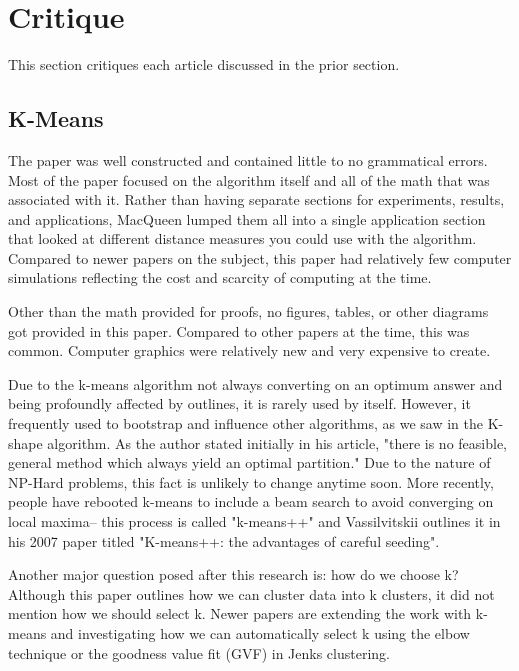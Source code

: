 \documentclass[12pt]{apa6}
\begin{document}
\section{Critique}

This section critiques each article discussed in the prior section.

\subsection{K-Means}


The paper was well constructed and contained little to no grammatical errors. Most of the paper focused on the algorithm itself and all of the math that was associated with it. Rather than having separate sections for experiments, results, and applications, MacQueen lumped them all into a single application section that looked at different distance measures you could use with the algorithm. Compared to newer papers on the subject, this paper had relatively few computer simulations reflecting the cost and scarcity of computing at the time. 

Other than the math provided for proofs, no figures, tables, or other diagrams got provided in this paper. Compared to other papers at the time, this was common. Computer graphics were relatively new and very expensive to create.

Due to the k-means algorithm not always converting on an optimum answer and being profoundly affected by outlines, it is rarely used by itself. However, it frequently used to bootstrap and influence other algorithms, as we saw in the K-shape algorithm. 
As the author stated initially in his article, "there is no feasible, general method which always yield an optimal partition." Due to the nature of NP-Hard problems, this fact is unlikely to change anytime soon. More recently, people have rebooted k-means to include a beam search to avoid converging on local maxima-- this process is called "k-means++" and Vassilvitskii outlines it in his  2007 paper titled "K-means++: the advantages of careful seeding"\cite{kplus}.

Another major question posed after this research is: how do we choose k? Although this paper outlines how we can cluster data into k clusters, it did not mention how we should select k. Newer papers are extending the work with k-means and investigating how we can automatically select k using the elbow technique or the goodness value fit (GVF) in Jenks clustering.
\end{document}
